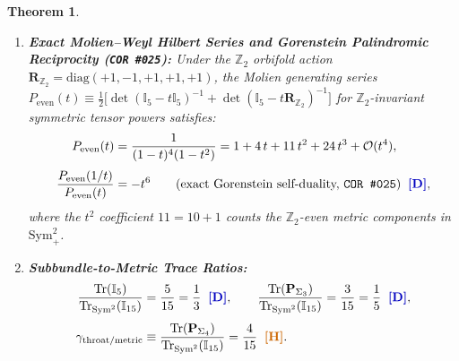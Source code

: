 \documentclass[11pt,a4paper]{article}
\newcommand{\catD}{\text{\textbf{\textcolor{blue!75!black}{[D]}}}}
\newcommand{\catH}{\text{\textbf{\textcolor{orange!80!black}{[H]}}}}
\theoremstyle{definition}
\theoremstyle{plain}
\newtheorem{theorem}[axiom]{Theorem}
\theoremstyle{remark}
\begin{document}
\begin{theorem}
\begin{enumerate}[label=(\roman*)]
  \begin{align}
  \mathbf{G}_{\mathrm{DW}}\,\mathbf{G}_{\mathrm{DW}}^{-1} = \mathbb{I}_{15}
  \quad &\Longleftrightarrow \quad
  1 + c_{\mathrm{DW}}^{-1} - \lambda\big(1 + D\,c_{\mathrm{DW}}^{-1}\big)\Big|_{\lambda=1/2} = \frac{1}{2}\big[1 - (D - 2)\,c_{\mathrm{DW}}^{-1}\big] = 0 \nonumber \\[4pt]
  &\Longleftrightarrow \quad
  c_{\mathrm{DW}}^{-1} = \frac{\lambda}{1 - \lambda D}\Bigg|_{\lambda=1/2} = -\frac{1}{D - 2}\Bigg|_{D=5} = -\frac{1}{3}
  \qquad \textnormal{(\texttt{COR~\#024})} \;\;\catD, \nonumber \\[4pt]
  \mathrm{sig}\!\left(\mathbf{G}_{\mathrm{DW}}\big|_{\mathrm{Sym}^2_-}\right) &= (+, -, -, -)
  \qquad \textnormal{(4D Lorentzian signature on $g_{\mu 2}$, \texttt{COR~\#026})} \;\;\catD. \label{eq:c1_dewitt_inverse_weight}
  \end{align}
  \item \textbf{Exact Molien--Weyl Hilbert Series and Gorenstein Palindromic Reciprocity (\texttt{COR~\#025}):}
  Under the $\mathbb{Z}_2$ orbifold action $\mathbf{R}_{\mathbb{Z}_2} = \mathrm{diag}(+1,-1,+1,+1,+1)$, the Molien generating series $P_{\mathrm{even}}(t) \equiv \frac{1}{2}\big[\det(\mathbb{I}_5 - t\mathbb{I}_5)^{-1} + \det(\mathbb{I}_5 - t\mathbf{R}_{\mathbb{Z}_2})^{-1}\big]$ for $\mathbb{Z}_2$-invariant symmetric tensor powers satisfies:
  \begin{align}
  P_{\mathrm{even}}(t) &= \frac{1}{(1 - t)^4(1 - t^2)} = 1 + 4\,t + 11\,t^2 + 24\,t^3 + \mathcal{O}(t^4), \nonumber \\[3pt]
  \frac{P_{\mathrm{even}}(1/t)}{P_{\mathrm{even}}(t)} &= -t^6 \qquad (\textnormal{exact Gorenstein self-duality, \texttt{COR~\#025}}) \;\;\catD, \label{eq:c1_molien_series}
  \end{align}
  where the $t^2$ coefficient $11 = 10 + 1$ counts the $\mathbb{Z}_2$-even metric components in $\mathrm{Sym}^2_+$.
  \item \textbf{Subbundle-to-Metric Trace Ratios:}
  \begin{align}
  \frac{\mathrm{Tr}(\mathbb{I}_5)}{\mathrm{Tr}_{\mathrm{Sym}^2}(\mathbb{I}_{15})} &= \frac{5}{15} = \frac{1}{3} \;\;\catD, \qquad
  \frac{\mathrm{Tr}(\mathbf{P}_{\Sigma_3})}{\mathrm{Tr}_{\mathrm{Sym}^2}(\mathbb{I}_{15})} = \frac{3}{15} = \frac{1}{5} \;\;\catD, \nonumber \\[3pt]
  \gamma_{\mathrm{throat/metric}} &\equiv \frac{\mathrm{Tr}(\mathbf{P}_{\Sigma_4})}{\mathrm{Tr}_{\mathrm{Sym}^2}(\mathbb{I}_{15})} = \frac{4}{15} \;\;\catH. \label{eq:c1_metric_trace_ratios}
  \end{align}
\end{enumerate}
\end{theorem}
\end{document}
